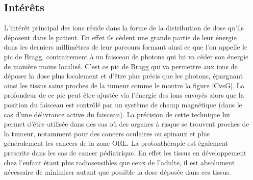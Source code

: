 \documentclass[11pt,a4paper,oldfontcommands]{memoir}
\begin{document}
\subsection{Intérêts}
L'intérêt principal des ions réside dans la forme de la distribution de  dose qu'ils déposent dans le patient. En effet ils cèdent une grande partie de leur énergie dans les derniers millimètres de leur parcours formant ainsi ce que l'on appelle le pic de Bragg, contrairement à un faisceau de photons qui lui va céder son énergie de manière moins localisé. C'est ce pic de Bragg qui va permettre aux ions de déposer la dose plus localement et d'être plus précis que les photons, épargnant ainsi les tissus sains proches de la tumeur comme le montre la figure \ref{CvsG}. La profondeur de ce pic peut être ajustée via l'énergie des ions envoyés alors que la position du faisceau est contrôlé par un système de champ magnétique (dans le cas d'une délivrance active du faisceau). La précision de cette technique lui permet d'être utilisée dans des cas où des organes à risque se trouvent proches de la tumeur, notamment pour des cancers oculaires ou spinaux et plus généralement les cancers de la zone ORL. La protonthérapie est également prescrite dans les cas de cancer pédiatrique. En effet les tissus en développement chez l'enfant étant plus radiosensibles que ceux de l'adulte, il est absolument nécessaire de minimiser autant que possible la dose déposée dans ces tissus. \\
\end{document}
